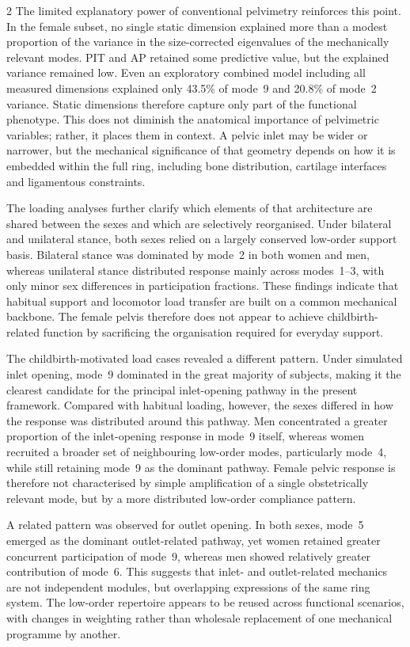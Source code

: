 \documentclass[openacc]{rsproca_new}
\begin{document}
\begin{multicols}{2}
The limited explanatory power of conventional pelvimetry reinforces this point. In the female subset, no single static dimension explained more than a modest proportion of the variance in the size-corrected eigenvalues of the mechanically relevant modes. PIT and AP retained some predictive value, but the explained variance remained low. Even an exploratory combined model including all measured dimensions explained only 43.5\% of mode~9 and 20.8\% of mode~2 variance. Static dimensions therefore capture only part of the functional phenotype. This does not diminish the anatomical importance of pelvimetric variables; rather, it places them in context. A pelvic inlet may be wider or narrower, but the mechanical significance of that geometry depends on how it is embedded within the full ring, including bone distribution, cartilage interfaces and ligamentous constraints.

The loading analyses further clarify which elements of that architecture are shared between the sexes and which are selectively reorganised. Under bilateral and unilateral stance, both sexes relied on a largely conserved low-order support basis. Bilateral stance was dominated by mode~2 in both women and men, whereas unilateral stance distributed response mainly across modes~1--3, with only minor sex differences in participation fractions. These findings indicate that habitual support and locomotor load transfer are built on a common mechanical backbone. The female pelvis therefore does not appear to achieve childbirth-related function by sacrificing the organisation required for everyday support.

The childbirth-motivated load cases revealed a different pattern. Under simulated inlet opening, mode~9 dominated in the great majority of subjects, making it the clearest candidate for the principal inlet-opening pathway in the present framework. Compared with habitual loading, however, the sexes differed in how the response was distributed around this pathway. Men concentrated a greater proportion of the inlet-opening response in mode~9 itself, whereas women recruited a broader set of neighbouring low-order modes, particularly mode~4, while still retaining mode~9 as the dominant pathway. Female pelvic response is therefore not characterised by simple amplification of a single obstetrically relevant mode, but by a more distributed low-order compliance pattern.

A related pattern was observed for outlet opening. In both sexes, mode~5 emerged as the dominant outlet-related pathway, yet women retained greater concurrent participation of mode~9, whereas men showed relatively greater contribution of mode~6. This suggests that inlet- and outlet-related mechanics are not independent modules, but overlapping expressions of the same ring system. The low-order repertoire appears to be reused across functional scenarios, with changes in weighting rather than wholesale replacement of one mechanical programme by another.


\end{multicols}
\end{document}
